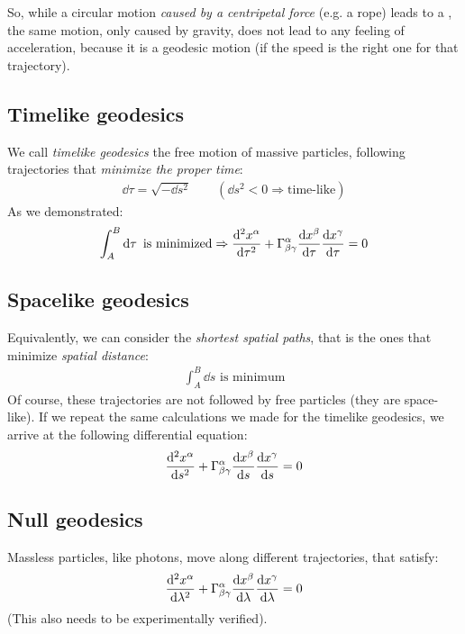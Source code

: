 \documentclass[../template.tex]{subfiles}
\begin{document}
So, while a circular motion \textit{caused by a centripetal force} (e.g. a rope) leads to a , the same motion, only caused by gravity, does not lead to any feeling of acceleration, because it is a geodesic motion (if the speed is the right one for that trajectory).

\subsection{Timelike geodesics}
We call \textit{timelike geodesics} the free motion of massive particles, following trajectories that \textit{minimize the proper time}:
\begin{align*}
    \dd{\tau} = \sqrt{-\dd{s}^2} \qquad (\dd{s^2} < 0 \Rightarrow \text{time-like})
\end{align*}  
As we demonstrated:
\begin{align*}
    \int_A^B \dd{\tau} \text{ is minimized} \Rightarrow \dv[2]{x^\alpha}{\tau} + \Gamma^\alpha_{\beta \gamma} \dv{x^\beta}{\tau}\dv{x^\gamma}{\tau} = 0
\end{align*}

\subsection{Spacelike geodesics}
Equivalently, we can consider the \textit{shortest spatial paths}, that is the ones that minimize \textit{spatial distance}:
\begin{align*}
    \int_A^B \dd{s} \text{ is minimum}
\end{align*}  
Of course, these trajectories are not followed by free particles (they are space-like). If we repeat the same calculations we made for the timelike geodesics, we arrive at the following differential equation:
\begin{align*}
    \dv[2]{x^\alpha}{s} + \Gamma^\alpha_{\beta \gamma} \dv{x^\beta}{s} \dv{x^\gamma}{s} = 0
\end{align*}

\subsection{Null geodesics}
Massless particles, like photons, move along different trajectories, that satisfy:
\begin{align*}
    \dv[2]{x^\alpha}{\lambda} + \Gamma^\alpha_{\beta \gamma}  \dv{x^\beta}{\lambda} \dv{x^\gamma}{\lambda} = 0
\end{align*}
(This also needs to be experimentally verified).
\end{document}
